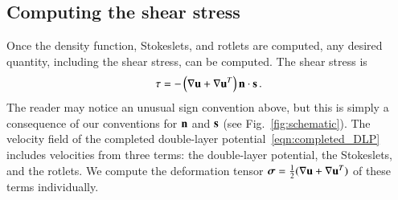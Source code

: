 \documentclass[preprint, 10pt]{elsarticle}
\begin{document}
\subsection{Computing the shear stress}
\label{sec:shearStressLP}
Once the density function, Stokeslets, and rotlets are computed, any
desired quantity, including the shear stress, can be computed.  The
shear stress is
\begin{align*}
  \tau = -\left(\nabla \uu + \nabla \uu^T \right)\nn \cdot \ss \, .
\end{align*}
The reader may notice an unusual sign convention above, but this is
simply a consequence of our conventions for $\nn$ and $\ss$ (see
Fig.~\ref{fig:schematic}).  The velocity field of the completed
double-layer potential~\eqref{eqn:completed_DLP} includes velocities
from three terms: the double-layer potential, the Stokeslets, and the
rotlets.  We compute the deformation tensor $\ssigma =
\frac{1}{2}(\nabla\uu + \nabla\uu^T)$ of these terms individually.
\end{document}
